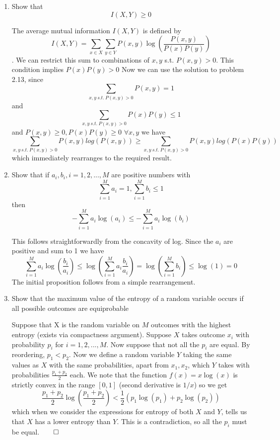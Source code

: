 \documentclass{article}
\newcommand{\chapternumber}{2}
\newenvironment{QandA}{\begin{enumerate}[label=\chapternumber.\arabic*]\bfseries\boldmath}
	{\end{enumerate}}
\newenvironment{answered}{\par\bigskip\normalfont\unboldmath}{}
\begin{document}
\begin{QandA}
	\item Show that 
	\[I(X,Y)\geq 0\]
	\begin{answered}
		The average mutual information $I(X,Y)$ is defined by
		\[I(X,Y)=\sum_{x\in X}\sum_{y\in Y}P(x,y)\log\left(\frac{P(x,y)}{P(x)P(y)}\right)\].
		We can restrict this sum to combinations of $x,y$ s.t. $P(x,y)>0$. This condition implies $P(x)P(y)>0$
		Now we can use the solution to problem 2.13, since 
		\[\sum_{x,y\ s.t.\ P(x,y)>0}P(x,y)=1\]
		and
		\[\sum_{x,y\ s.t.\ P(x,y)>0}P(x)P(y)\leq1\]
		and $P(x,y)\geq 0,P(x)P(y)\geq0$ $\forall x,y$
		we have
		\[\sum_{x,y\ s.t.\ P(x,y)>0}P(x,y)log(P(x,y))\geq \sum_{x,y\ s.t.\ P(x,y)>0}P(x,y)log(P(x)P(y))\]
		which immediately rearranges to the required result.
	\end{answered}

	\item Show that if $a_i,b_i,i=1,2,...,M$ are positive numbers with
	\[\sum_{i=1}^Ma_i=1,\sum_{i=1}^Mb_i\leq1\]
	then
	\[-\sum_{i=1}^Ma_i\log(a_i)\leq-\sum_{i=1}^Ma_i\log(b_i)\]
	\begin{answered}
		This follows straightforwardly from the concavity of log. Since the $a_i$ are positive and sum to 1 we have
	\[\sum_{i=1}^Ma_i\log\left(\frac{b_i}{a_i}\right)\leq \log\left(\sum_{i=1}^Ma_i\frac{b_i}{a_i}\right)=\log\left(\sum_{i=1}^Mb_i\right)\leq \log(1)=0\]
	The initial proposition follows from a simple rearrangement.
	\end{answered}


	\item Show that the maximum value of the entropy of a random variable occurs if all possible outcomes are equiprobable
	\begin{answered}
		Suppose that X is the random variable on $M$ outcomes with the highest entropy (exists via compactness argument). Suppose $X$ takes outcome $x_i$ with probability $p_i$ for $i=1,2,...,M$. Now suppose that not all the $p_i$ are equal. By reordering, $p_1< p_2$. Now we define a random variable $Y$ taking the same values as $X$ with the same probabilities, apart from $x_1,x_2$, which $Y$ takes with probabilities $\frac{p_1+p_2}{2}$ each. We note that the function $f(x)=x\log(x)$ is strictly convex in the range $[0,1]$ (second derivative is $1/x$) so we get
		\[\frac{p_1+p_2}{2}\log\left(\frac{p_1+p_2}{2}\right)<\frac{1}{2}(p_1\log(p_1)+p_2\log(p_2))\]
		which when we consider the expressions for entropy of both $X$ and $Y$, tells us that $X$ has a lower entropy than $Y$. This is a contradiction, so all the $p_i$ must be equal.$\qed$
		

\end{answered}
\end{QandA}
\end{document}
